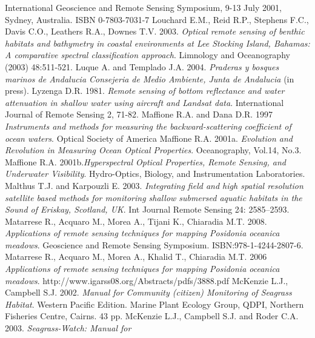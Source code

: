 \documentclass[10pt, a4paper]{article}
\begin{document}
\begin{thebibliography}{999}
International Geoscience and Remote Sensing Symposium, 9-13 July 2001, Sydney,
Australia. ISBN 0-7803-7031-7 \pageref{Lewis01}
Louchard E.M., Reid R.P., Stephens F.C., Davis C.O., Leathers R.A., Downes T.V.
2003. \emph{Optical remote sensing of benthic habitats and bathymetry in coastal environments at
Lee Stocking Island, Bahamas: A comparative spectral classification approach}. Limnology
and Oceanography (2003) 48:511-521. \pageref{Louchard03}
Luque A. and Templado J.A. 2004. \emph{Praderas y bosques marinos de Andalucia
Consejeria de Medio Ambiente, Junta de Andalucia} (in press). \pageref{Luque04}
Lyzenga D.R. 1981. \emph{Remote sensing of bottom reflectance and water attenuation in
shallow water using aircraft and Landsat data}. International Journal of Remote Sensing 2,
71-82. \pageref{Lyzenga81}
Maffione R.A. and Dana D.R. 1997 \emph{Instruments and methods for measuring the
backward-scattering coefficient of ocean waters}. Optical Society of America \pageref{Maffione97}
Maffione R.A. 2001a. \emph{Evolution and Revolution in Measuring Ocean Optical Properties}.
Oceanography, Vol.14, No.3. \pageref{Maffione01a}
Maffione R.A. 2001b.\emph{Hyperspectral Optical Properties, Remote Sensing, and
Underwater Visibility}. Hydro-Optics, Biology, and Instrumentation Laboratories. \pageref{Maffione01b}
Malthus T.J. and Karpouzli E. 2003. \emph{Integrating field and high spatial resolution
satellite based methods for monitoring shallow submersed aquatic habitats in the Sound of
Eriskay, Scotland, UK}. Int Journal Remote Sensing 24: 2585–2593. \pageref{Malthus03}
Matarrese R., Acquaro M., Morea A., Tijani K., Chiaradia M.T. 2008. \emph{Applications of
remote sensing techniques for mapping \textit{Posidonia oceanica} meadows}. Geoscience and
Remote Sensing Symposium. ISBN:978-1-4244-2807-6. \pageref{Matarrese08}
Matarrese R., Acquaro M., Morea A., Khalid T., Chiaradia M.T. 2006 \emph{Applications of remote
sensing techniques for mapping \textit{Posidonia oceanica} meadows}.
http://www.igarss08.org/Abstracts/pdfs/3888.pdf \pageref{Matarrese06}
McKenzie L.J., Campbell S.J. 2002. \emph{Manual for Community (citizen) Monitoring of
Seagrass Habitat}. Western Pacific Edition. Marine Plant Ecology Group, QDPI, Northern
Fisheries Centre, Cairns. 43 pp. \pageref{McKenzie02}
McKenzie L.J., Campbell S.J. and Roder C.A. 2003. \emph{Seagrass-Watch: Manual for
}
\end{thebibliography}
\end{document}
